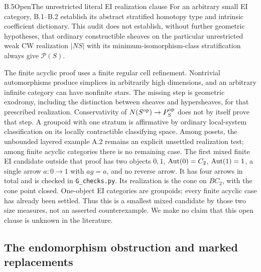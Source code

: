 \begin{statement}{B.5}{Open}{The unrestricted literal EI realization clause}
For an arbitrary small EI category, B.1--B.2 establish its abstract
stratified homotopy type and intrinsic coefficient dictionary. This
audit does not establish, without further geometric hypotheses, that
ordinary constructible sheaves on the particular unrestricted weak CW
realization $|NS|$ with its minimum-isomorphism-class stratification
always give $\mathcal P(S)$.
\end{statement}
The finite acyclic proof uses a finite regular cell refinement. Nontrivial
automorphisms produce simplices in arbitrarily high dimensions, and an
arbitrary infinite category can have nonfinite stars. The missing step
is geometric exodromy, including the distinction between sheaves and
hypersheaves, for that prescribed realization. Conservativity of
$N(S^{\mathrm{op}})\to P_S^{\mathrm{op}}$ does not by itself prove that step. A groupoid
with one stratum is affirmative by ordinary local-system classification
on its locally contractible classifying space. Among posets, the
unbounded layered example A.2 remains an explicit unsettled realization
test; among finite acyclic categories there is no remaining case. The
first mixed finite EI candidate outside that proof has two objects
$0,1$, $\operatorname{Aut}(0)=C_2$, $\operatorname{Aut}(1)=1$, a single arrow $a:0\to1$ with
$ag=a$, and no reverse arrow. It has four arrows in total and is
checked in \texttt{G\_checks.py}. Its realization is the cone on
$BC_2$, with the cone point closed. One-object EI categories are
groupoids; every finite acyclic case has already been settled. Thus
this is a smallest mixed candidate by those two size measures, not
an asserted counterexample. We make no claim that this open clause
is unknown in the literature.

\subsection{The endomorphism obstruction and marked replacements}

